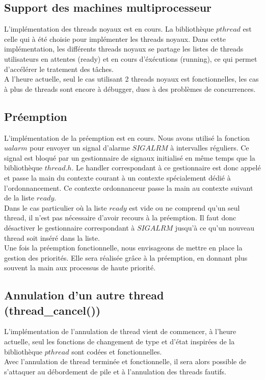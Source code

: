 \subsection{Support des machines multiprocesseur}
L'implémentation des threads noyaux est en cours. La bibliothèque $pthread$ est celle qui à été choisie pour implémenter les threads noyaux. Dans cette implémentation, les différents threads noyaux se partage les listes de threads utilisateurs en attentes (ready) et en cours d'éxécutions (running), ce qui permet d'accélérer le tratement des tâches.\\
\indent A l'heure actuelle, seul le cas utilisant 2 threads noyaux est fonctionnelles, les cas à plus de threads sont encore à débugger, dues à des problèmes de concurrences.

\subsection{Préemption}
L'implémentation de la préemption est en cours. Nous avons utilisé la fonction $ualarm$ pour envoyer un signal d'alarme $SIGALRM$ à intervalles réguliers. Ce signal est bloqué par un gestionnaire de signaux initialisé en même temps que la bibliothèque $thread.h$. Le handler correspondant à ce gestionnaire est donc appelé et passe la main du contexte courant à un contexte spécialement dédié à l'ordonnancement. Ce contexte ordonnanceur passe la main au contexte suivant de la liste $ready$.\\
\indent Dans le cas particulier où la liste $ready$ est vide ou ne comprend qu'un seul thread, il n'est pas nécessaire d'avoir recours à la préemption. Il faut donc désactiver le gestionnaire correspondant à $SIGALRM$ jusqu'à ce qu'un nouveau thread soit inséré dans la liste.\\
\indent Une fois la préemption fonctionnelle, nous envisageons de mettre en place la gestion des priorités. Elle sera réalisée grâce à la préemption, en donnant plus souvent la main aux processus de haute priorité.
 
\subsection{Annulation d'un autre thread (thread\_cancel())}
L'implémentation de l'annulation de thread vient de commencer, à l'heure actuelle, seul les fonctions de changement de type et d'état inspirées de la bibliothèque $pthread$ sont codées et fonctionnelles.\\
\indent Avec l'annulation de thread terminée et fonctionnelle, il sera alors possible de s'attaquer au débordement de pile et à l'annulation des threads fautifs.

